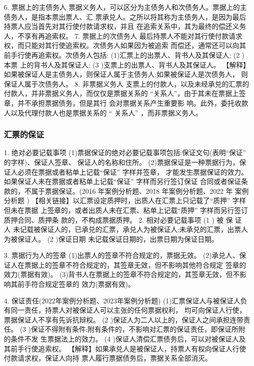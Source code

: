 \documentclass[UTF8,12pt]{ctexart}
\numberwithin{equation}{section} %
\numberwithin{figure}{section}
\numberwithin{table}{section}
\begin{document}
	6. 票据上的主债务人 票据义务人，可以区分为主债务人和次债务人。票据上的主债务人，是指本票出票人、汇 票承兑人。之所以将其称为主债务人，是因为最后持票人应当首先对其行使付款请求权，并且 在追索关系中，其为最终的偿还义务人，不享有再追索权。
	7. 票据上的次债务人 最后持票人不能对其行使付款请求权，而只能对其行使追索权。次债务人如果因为被追索 而偿还，通常还可以向其前手行使再追索权。次债务人包括: (1)汇票上的出票人、背书人及其保证人;
	(2 )本票 上的背书人及其保证人;
	(3 )支票上的出票人、背书人及其保证人。 【解释】如果被保证人是主债务人，则保证人属于主债务人;如果被保证人是次债务人， 则保证人属于次债务人。
	8. 非票据义务人 支票上的付款人，以及未经承兑的汇票的付款人，并非票据义务人，而仅仅是票据关系的 “关系人”，由于其未在票据上签章，并不承担票据债务，但是其行 会对票据关系产生重要影 响。此外，委托收款人以及代理付款人也是票据关系的 “ 关系人” ，而非票据义务人。
	
	
	
	\subsubsection{汇票的保证} 
	1. 绝对必要记载事项
	(1)票据保证的绝对必要记载事项包括:保证文句(表明“保证” 的字样)、保证人签章、 保证人的名称和住所。 (2)票据保证是一种票据行为，保证人必须在票据或者粘单上记载“保证” 字样并签章， 才能发生票据保证的效力。如果保证人未在票据或者粘单上记载“保证” 字样而另行签订保证 合同或者保证条款的，不属于票据保证。(2016 年案例分析题、2018 年案例分析题、2022 年 案例分析题 )
	【相关链接】以汇票设定质押时，出质人在汇票上只记载了“质押” 字样但未在票据 上签章的，或者出质人未在汇票、粘单上记载“质押” 字样而另行签订质押合同、质押条 款的，不构成票据质押。
	2. 相对必要记载事项
	(1 ) 被 保 证 人 未记载被保证人的，已承兑的汇票，承兑人为被保证人;未承兑的汇票，出票人为被保证人。 (2 )保证日期
	未记载保证日期的，出票日期为保证日期。
	
	 3. 票据行为人的签章
	 (1)出票人的签章不符合规定的，票据无效。 (2)承兑人、保证人在票据上的签章不符合规定的，其签章无效，但不影响其他符合规定 签章的效力(票据有效)。 (3)背书人在票据上的签章不符合规定的，其签章无效，但不影响其前手符合规定签章的 效力(票据有效)。
	 
	 4. 保证责任(2022年案例分析题、2023年案例分析题) (1)汇票保证人与被保证人负有同一责任，持票人对被保证人可以主张的任何票据权利， 均可向保证人行使，票据保证人不享有先诉抗辩权。
	 (2 )保证人为二人以上的，保证人之间承担连带责任。
	 (3 )保证不得附有条件;附有条件的，不影响对汇票的保证责任，即保证所附的条件不发 生票据法上的效力。
	 (4 )保证人清偿汇票债务后，可以对被保证人及其前手行使追索权。 【解释】如果承兑人是被保证人，持票人有权向保证人行使付款请求权，保证人向持 票人履行票据债务后，票据关系全部消灭。
	 
\end{document}
